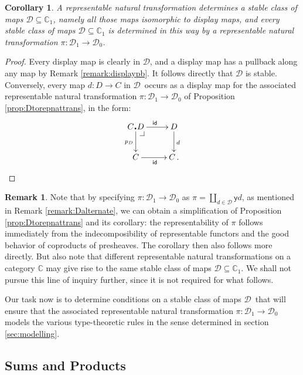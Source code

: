 \documentclass[12pt]{article}
\makeatletter
\newcommand{\C}{\ensuremath{\mathbb{C}}}
\newcommand{\D}{\ensuremath{\mathcal{D}}}
\newcommand{\pbcorner}[1][dr]{\save*!/#1-1.2pc/#1:(-1,1)@^{|-}\restore}
\newcommand{\identity}{\ensuremath{\mathsf{id}}}
\newcommand{\y}{\ensuremath{\mathsf{y}}}
\newcommand{\ext}[2]{{#1\!\centerdot\! #2}}
\newtheorem{corollary}[theorem]{Corollary}
\theoremstyle{definition}
\newtheorem{remark}[theorem]{Remark}
\makeatother
\begin{document}
\begin{corollary}\label{cor:repnattransstableclass}
A representable natural transformation determines a stable class of maps $\D\subseteq \C_1$, namely all those maps isomorphic to display maps, and every stable class of maps $\D\subseteq \C_1$ is determined in this way by a representable natural transformation $\pi : \D_1\to\D_0$.
\end{corollary}

\begin{proof}
Every display map is clearly in \D, and a display map has a pullback along any map by Remark \ref{remark:displaypb}.  It follows directly that $\D$ is stable.  Conversely, every map $d : D\to C$ in \D\ occurs as a display map for the associated representable natural transformation $\pi : \D_1\to\D_0$ of Proposition \ref{prop:Dtorepnattrans}, in the form: 
\[
\xymatrix{
\ext{C}{D} \ar[d]_{p_D} \pbcorner \ar[r]^{\identity} &  D\ar[d]^{d}\\
C \ar[r]_{\identity}   & C\,.}
\]
\end{proof}
%

\begin{remark}
Note that by specifying $\pi : \D_1\to\D_0$ as $\pi = \coprod_{d\in\D}\y{d}$, as mentioned in Remark \ref{remark:Dalternate}, we can obtain a simplification of Proposition \ref{prop:Dtorepnattrans} and its corollary: the representability of $\pi$ follows immediately from the indecomposibility of representable functors and the good behavior of coproducts of presheaves. The corollary then also follows more directly.
But also note that different representable natural transformations on a category $\C$ may give rise to the same stable class of maps $\D\subseteq\C_1$.  We shall not pursue this line of inquiry further, since it is not required for what follows.
\end{remark}

Our task now is to determine conditions on a stable class of maps \D\ that will ensure that the associated representable natural transformation $\pi : \D_1 \to \D_0$ models the various type-theoretic rules in the sense  determined in section \ref{sec:modelling}.

\subsection{Sums and Products}
\end{document}
